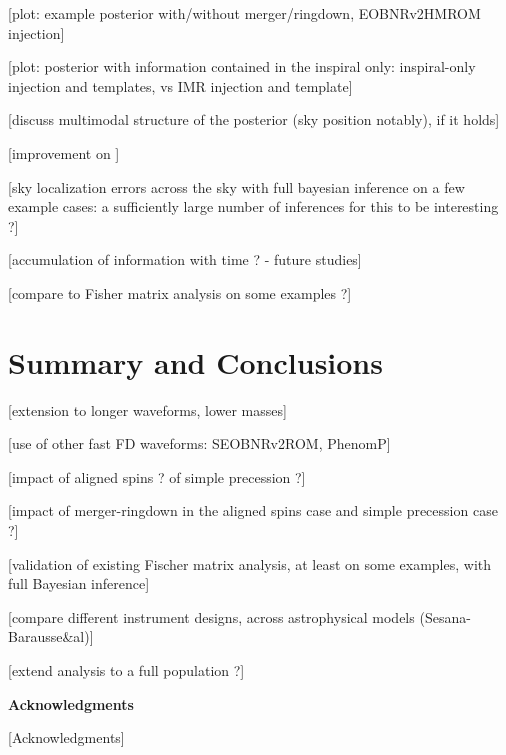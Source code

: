 \documentclass[aps,showpacs,%
prd,superscriptaddress,nofootinbib]{revtex4}
\begin{document}
[plot: example posterior with/without merger/ringdown, EOBNRv2HMROM injection]

[plot: posterior with information contained in the inspiral only: inspiral-only injection and templates, vs IMR injection and template]

[discuss multimodal structure of the posterior (sky position notably), if it holds]

[improvement on ]

[sky localization errors across the sky with full bayesian inference on a few example cases: a sufficiently large number of inferences for this to be interesting ?]

[accumulation of information with time ? - future studies]

[compare to Fisher matrix analysis on some examples ?]


\section{Summary and Conclusions}
\label{sec:conc}

[extension to longer waveforms, lower masses]

[use of other fast FD waveforms: SEOBNRv2ROM, PhenomP]

[impact of aligned spins ? of simple precession ?]

[impact of merger-ringdown in the aligned spins case and simple precession case ?]

[validation of existing Fischer matrix analysis, at least on some examples, with full Bayesian inference]

[compare different instrument designs, across astrophysical models (Sesana-Barausse\&al)]

[extend analysis to a full population ?]


\vspace{4.5mm}

\hspace{0.85in}
{\bf Acknowledgments}

\vspace{3.5mm}

[Acknowledgments]

\end{document}
